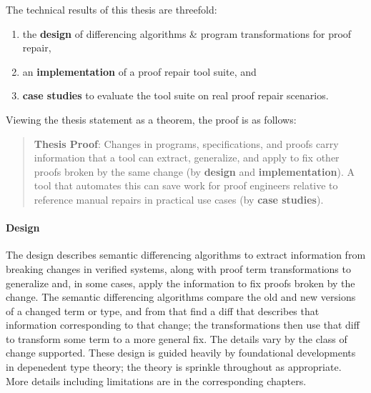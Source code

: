 The technical results of this thesis are threefold:

\begin{enumerate}
\item the \textbf{design} of differencing algorithms \& program transformations for proof repair, 
\item an \textbf{implementation} of a proof repair tool suite, and
\item \textbf{case studies} to evaluate the tool suite on real proof repair scenarios.
\end{enumerate}
Viewing the thesis statement as a theorem, the proof is as follows: %

\begin{quote}
\textbf{Thesis Proof}: Changes in programs, specifications, and proofs carry information that a tool can extract, generalize, and apply to fix other proofs broken by the same change (by \textbf{design} and \textbf{implementation}). A tool that automates this can save work for proof engineers relative to reference manual repairs in practical use cases (by \textbf{case studies}).
\end{quote}

\paragraph{Design}
The design describes semantic differencing algorithms to extract information from breaking changes in verified systems,
along with proof term transformations to generalize and, in some cases, apply the information to fix proofs broken by the change. %
The semantic differencing algorithms compare the old and new versions of a changed term or type,
and from that find a diff that describes that information corresponding to that change;
the transformations then use that diff to transform some term to a more general fix.
The details vary by the class of change supported.
These design is guided heavily by foundational developments in depenedent type theory;
the theory is sprinkle throughout as appropriate. %
More details including limitations are in the corresponding chapters. %

